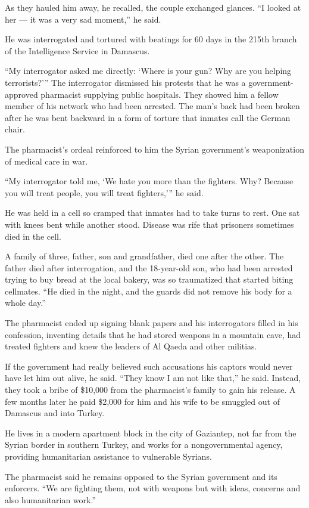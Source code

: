 As they hauled him away, he recalled, the couple exchanged glances. ``I
looked at her --- it was a very sad moment,'' he said.

He was interrogated and tortured with beatings for 60 days in the 215th
branch of the Intelligence Service in Damascus.

``My interrogator asked me directly: `Where is your gun? Why are you
helping terrorists?''' The interrogator dismissed his protests that he
was a government-approved pharmacist supplying public hospitals. They
showed him a fellow member of his network who had been arrested. The
man's back had been broken after he was bent backward in a form of
torture that inmates call the German chair.

The pharmacist's ordeal reinforced to him the Syrian government's
weaponization of medical care in war.

``My interrogator told me, `We hate you more than the fighters. Why?
Because you will treat people, you will treat fighters,''' he said.

He was held in a cell so cramped that inmates had to take turns to rest.
One sat with knees bent while another stood. Disease was rife that
prisoners sometimes died in the cell.

A family of three, father, son and grandfather, died one after the
other. The father died after interrogation, and the 18-year-old son, who
had been arrested trying to buy bread at the local bakery, was so
traumatized that started biting cellmates. ``He died in the night, and
the guards did not remove his body for a whole day.''

The pharmacist ended up signing blank papers and his interrogators
filled in his confession, inventing details that he had stored weapons
in a mountain cave, had treated fighters and knew the leaders of Al
Qaeda and other militias.

If the government had really believed such accusations his captors would
never have let him out alive, he said. ``They know I am not like that,''
he said. Instead, they took a bribe of \$10,000 from the pharmacist's
family to gain his release. A few months later he paid \$2,000 for him
and his wife to be smuggled out of Damascus and into Turkey.

He lives in a modern apartment block in the city of Gaziantep, not far
from the Syrian border in southern Turkey, and works for a
nongovernmental agency, providing humanitarian assistance to vulnerable
Syrians.

The pharmacist said he remains opposed to the Syrian government and its
enforcers. ``We are fighting them, not with weapons but with ideas,
concerns and also humanitarian work.''

